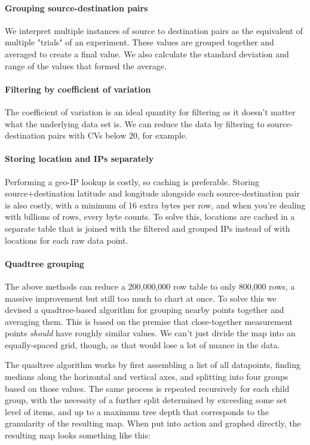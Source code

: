 \documentclass[12pt]{article}
\begin{document}
\paragraph{Grouping source-destination pairs}

We interpret multiple instances of source to destination pairs as the equivalent of multiple "trials" of an experiment. These values are grouped together and averaged to create a final value. We also calculate the standard deviation and range of the values that formed the average.

\paragraph{Filtering by coefficient of variation}

The coefficient of variation is an ideal quantity for filtering as it doesn't matter what the underlying data set is. We can reduce the data by filtering to source-destination pairs with CVs below 20, for example.

\paragraph{Storing location and IPs separately}

Performing a geo-IP lookup is costly, so caching is preferable. Storing source+destination latitude and longitude alongside each source-destination pair is also costly, with a minimum of 16 extra bytes per row, and when you're dealing with billions of rows, every byte counts. To solve this, locations are cached in a separate table that is joined with the filtered and grouped IPs instead of with locations for each raw data point.

\paragraph{Quadtree grouping}

The above methods can reduce a \textapprox{}200,000,000 row table to only \textapprox{}800,000 rows, a massive improvement but still too much to chart at once. To solve this we devised a quadtree-based algorithm for grouping nearby points together and averaging them. This is based on the premise that close-together measurement points \textit{should} have roughly similar values. We can't just divide the map into an equally-spaced grid, though, as that would lose a lot of nuance in the data.

The quadtree algorithm works by first assembling a list of all datapoints, finding medians along the horizontal and vertical axes, and splitting into four groups based on those values. The same process is repeated recursively for each child group, with the necessity of a further split determined by exceeding some set level of items, and up to a maximum tree depth that corresponds to the granularity of the resulting map. When put into action and graphed directly, the resulting map looks something like this:
\end{document}
